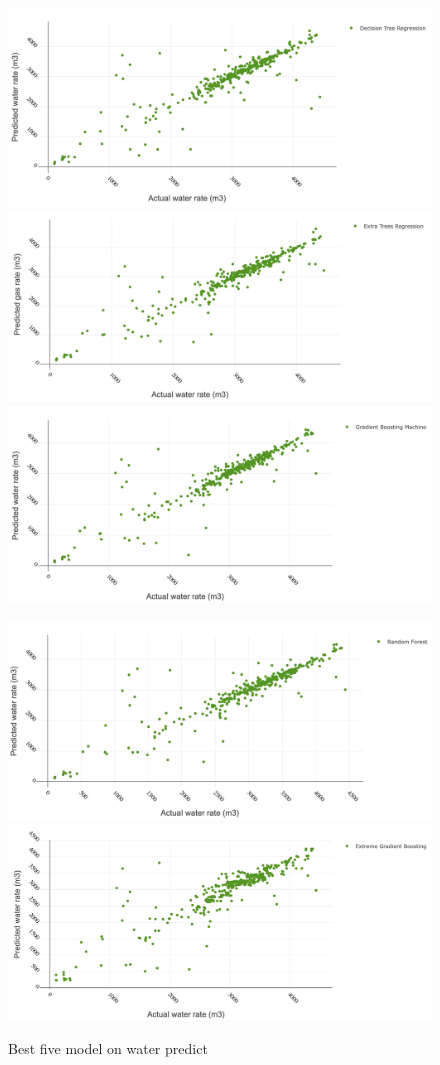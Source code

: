\documentclass[12pt,a4paper]{report}
\begin{document}
\begin{figure}[H]
\centering
\includegraphics[width=.3\textwidth]{5best_water/DCT}\quad
\includegraphics[width=.3\textwidth]{5best_water/ETT}\quad
\includegraphics[width=.3\textwidth]{5best_water/GBM}

\medskip

\includegraphics[width=.3\textwidth]{5best_water/RF}\quad
\includegraphics[width=.3\textwidth]{5best_water/XGB}

\caption{Best five model on water predict}
\label{pics:blablabla}
\end{figure}
\end{document}
